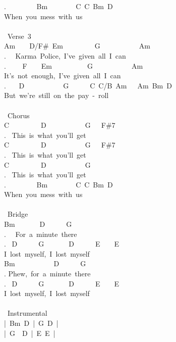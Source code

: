 {. \ \ \ \ \ \ \ \ Bm\ \ \ \ \ \ \ \ C\ C\ Bm\ D\\
When\ you\ mess\ with\ us\\
\\
\lbrack\ Verse\ 3\rbrack\\
Am\ \ \ \ D/F\#\ Em\ \ \ \ \ \ \ \ \ G\ \ \ \ \ \ \ \ \ \ \ Am\\
. \ \ Karma\ Police,\ I've\ given\ all\ I\ can\\
. \ \ \ \ F\ \ \ \ Em\ \ \ \ \ \ \ \ \ \ G\ \ \ \ \ \ \ \ \ \ \ Am\\
It's\ not\ enough,\ I've\ given\ all\ I\ can\\
. \ \ \ D\ \ \ \ \ \ \ \ \ \ \ G\ \ \ \ \ \ C\ C/B\ Am\ \ \ Am\ Bm\ D\\
But\ we're\ still\ on\ the\ pay\ -\ roll\\
\\
\lbrack\ Chorus\rbrack\\
C\ \ \ \ \ \ \ \ \ D\ \ \ \ \ \ \ \ \ \ \ G\ \ \ F\#7\\
. \ This\ is\ what\ you'll\ get\\
C\ \ \ \ \ \ \ \ \ D\ \ \ \ \ \ \ \ \ \ \ G\ \ \ F\#7\\
. \ This\ is\ what\ you'll\ get\\
C\ \ \ \ \ \ \ \ \ D\ \ \ \ \ \ \ \ \ \ \ G\\
. \ This\ is\ what\ you'll\ get\\
. \ \ \ \ \ \ \ \ Bm\ \ \ \ \ \ \ \ C\ C\ Bm\ D\\
When\ you\ mess\ with\ us\\
\\
\lbrack\ Bridge\rbrack\\
Bm\ \ \ \ \ \ \ D\ \ \ \ \ \ G\\
. \ \ For\ a\ minute\ there\\
. \ D\ \ \ \ \ \ G\ \ \ \ \ \ \ D\ \ \ \ \ \ E\ \ \ \ E\\
I\ lost\ myself,\ I\ lost\ myself\\
Bm\ \ \ \ \ \ \ \ \ \ \ D\ \ \ \ \ \ G\\
. Phew,\ for\ a\ minute\ there\\
. \ D\ \ \ \ \ \ G\ \ \ \ \ \ \ D\ \ \ \ \ \ E\ \ \ \ E\\
I\ lost\ myself,\ I\ lost\ myself\\
\\
\lbrack\ Instrumental\rbrack\\
|\ Bm\ D\ |\ G\ D\ |\\
|\ G\ \ D\ |\ E\ E\ |\\
}
